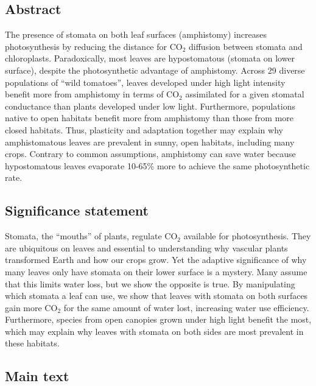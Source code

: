 \documentclass[
  letterpaper,
  DIV=11,
  numbers=noendperiod]{scrartcl}
\begin{document}
\newpage
\begin{linenumbers}
\begin{doublespace}

\subsection{Abstract}\label{abstract}

The presence of stomata on both leaf surfaces (amphistomy) increases
photosynthesis by reducing the distance for CO\(_2\) diffusion between
stomata and chloroplasts. Paradoxically, most leaves are hypostomatous
(stomata on lower surface), despite the photosynthetic advantage of
amphistomy. Across 29 diverse populations of ``wild tomatoes'', leaves
developed under high light intensity benefit more from amphistomy in
terms of CO\(_2\) assimilated for a given stomatal conductance than
plants developed under low light. Furthermore, populations native to
open habitats benefit more from amphistomy than those from more closed
habitats. Thus, plasticity and adaptation together may explain why
amphistomatous leaves are prevalent in sunny, open habitats, including
many crops. Contrary to common assumptions, amphistomy can save water
because hypostomatous leaves evaporate 10-65\% more to achieve the same
photosynthetic rate.

\subsection{Significance statement}\label{significance-statement}

Stomata, the ``mouths'' of plants, regulate CO\(_2\) available for
photosynthesis. They are ubiquitous on leaves and essential to
understanding why vascular plants transformed Earth and how our crops
grow. Yet the adaptive significance of why many leaves only have stomata
on their lower surface is a mystery. Many assume that this limits water
loss, but we show the opposite is true. By manipulating which stomata a
leaf can use, we show that leaves with stomata on both surfaces gain
more CO\(_2\) for the same amount of water lost, increasing water use
efficiency. Furthermore, species from open canopies grown under high
light benefit the most, which may explain why leaves with stomata on
both sides are most prevalent in these habitats.

\subsection{Main text}\label{main-text}


\end{doublespace}
\end{linenumbers}
\end{document}
